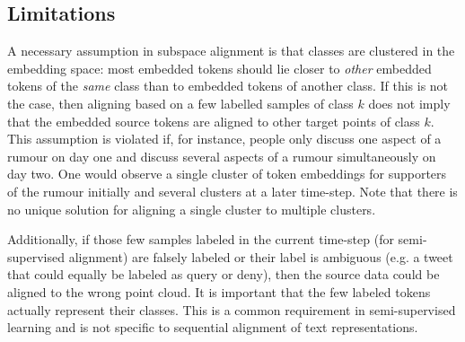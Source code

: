 \documentclass[letterpaper]{article} %
\begin{document}
\subsection{Limitations}
A necessary assumption in subspace alignment is that classes are clustered in the embedding space: most embedded tokens should lie closer to \textit{other} embedded tokens of the \textit{same} class than to embedded tokens of another class. If this is not the case, then aligning based on a few labelled samples of class $k$ does not imply that the embedded source tokens are aligned to other target points of class $k$. This assumption is violated if, for instance, people only discuss one aspect of a rumour on day one and discuss several aspects of a rumour simultaneously on day two. One would observe a single cluster of token embeddings for supporters of the rumour initially and several clusters at a later time-step.
Note that there is no unique solution for aligning a single cluster to multiple clusters.

Additionally, if those few samples labeled in the current time-step (for semi-supervised alignment) are falsely labeled or their label is ambiguous (e.g. a tweet that could equally be labeled as {\sc query} or {\sc deny}), then the source data could be aligned to the wrong point cloud. It is important that the few labeled tokens actually represent their classes. This is a common requirement in semi-supervised learning and is not specific to sequential alignment of text representations.


\end{document}
